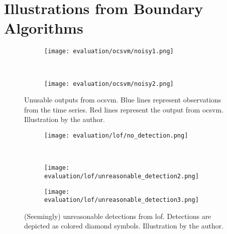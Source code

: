 \section{Illustrations from Boundary Algorithms}

\begin{figure}[htp!]
    \begin{subfigure}[b]{\linewidth}
        \centering
        \texttt{[image: evaluation/ocsvm/noisy1.png]}
    \end{subfigure}%
    \\
    \begin{subfigure}[b]{\linewidth}
        \centering
        \texttt{[image: evaluation/ocsvm/noisy2.png]}
    \end{subfigure}
    \caption{Unusable outputs from \gls{ocsvm}. Blue lines represent observations
    from the time series. Red lines represent the output from \gls{ocsvm}.
    Illustration by the author.}\label{fig:ocsvm-output}
\end{figure}

\begin{figure}[htp!]
    \begin{subfigure}[b]{\linewidth}
        \centering
        \texttt{[image: evaluation/lof/no\_detection.png]}
    \end{subfigure}%
    \\
    \begin{subfigure}[b]{\linewidth}
        \centering
        \texttt{[image: evaluation/lof/unreasonable\_detection2.png]}
    \end{subfigure}
\end{figure}

\begin{figure}[htp!]
    \ContinuedFloat{}
    \begin{subfigure}[b]{\linewidth}
        \centering
        \texttt{[image: evaluation/lof/unreasonable\_detection3.png]}
    \end{subfigure}
    \caption{(Seemingly) unreasonable detections from \gls{lof}. Detections are
    depicted as colored diamond symbols. Illustration by the author.}\label{fig:lof-output}
\end{figure}

